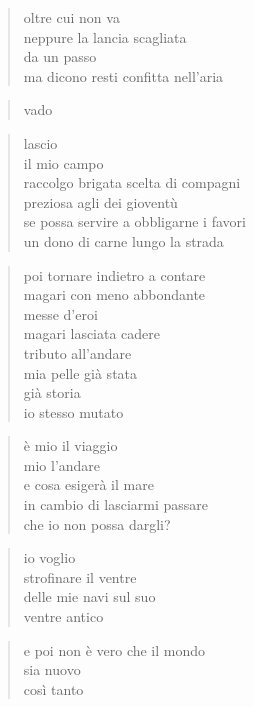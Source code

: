 	\begin{verse}
		oltre cui non va\\
		neppure la lancia scagliata\\
		da un passo\\
		ma dicono resti confitta nell’aria
	\end{verse}

	\begin{verse}
		vado
	\end{verse}

	\begin{verse}
		lascio\\
		il mio campo\\
		raccolgo brigata scelta di compagni\\
		preziosa agli dei gioventù\\
		se possa servire a obbligarne i favori\\
		un dono di carne lungo la strada
	\end{verse}

	\begin{verse}
		poi tornare indietro a contare\\
		magari con meno abbondante\\
		messe d’eroi\\
		magari lasciata cadere\\
		tributo all’andare\\
		mia pelle già stata\\
		già storia\\
		io stesso mutato
	\end{verse}

	\begin{verse}
		è mio il viaggio\\
		mio l’andare\\
		e cosa esigerà il mare\\
		in cambio di lasciarmi passare\\
		che io non possa dargli?
	\end{verse}

	\begin{verse}
		io voglio\\
		strofinare il ventre\\
		delle mie navi sul suo\\
		ventre antico
	\end{verse}

	\begin{verse}
		e poi non è vero che il mondo\\
		sia nuovo\\
		così tanto
	\end{verse}

